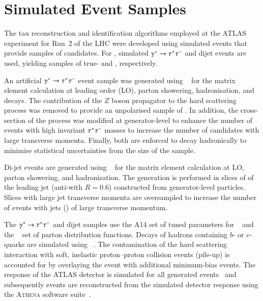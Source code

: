 \section{Simulated Event Samples}%
\label{sec:tauid_mc}

The tau reconstruction and identification algorithms employed at the
ATLAS experiment for Run~2 of the LHC were developed using simulated
events that provide samples of \tauhadvis candidates. For \tauid,
simulated $\gamma^{*} \to \tau^{+} \tau^{-}$ and dijet events are used,
yielding samples of true- and \faketauhadvis, respectively.

An artificial $\gamma^{*} \to \tau^{+} \tau^{-}$ event sample was generated
using \PYTHIA[8.212]~\cite{Sjostrand:2014zea} for the matrix element
calculation at leading order (LO), parton showering, hadronisation,
and \taulepton decays. The contribution of the $Z$ boson propagator to
the hard scattering process was removed to provide an unpolarised
sample of \tauleptons. In addition, the cross-section of the process
was modified at generator-level to enhance the number of events with
high invariant $\tau^{+} \tau^{-}$ masses to increase the number of \tauhadvis
candidates with large transverse momenta. Finally, both \tauleptons
are enforced to decay hadronically to minimise statistical
uncertainties from the size of the \truetauhadvis sample.

Di-jet events are generated using
\PYTHIA[8.186]~\cite{Sjostrand:2014zea} for the matrix element
calculation at LO, parton showering, and hadronisation. The generation
is performed in slices of \pT of the leading jet (anti-\kt with
$R = 0.6$) constructed from generator-level particles. Slices with
large jet transverse momenta are oversampled to increase the number of
events with jets (\faketauhadvis) of large transverse momentum.

The $\gamma^{*} \to \tau^{+} \tau^{-}$ and dijet samples use the A14 set of
tuned parameters for \PYTHIA[8]~\cite{ATL-PHYS-PUB-2014-021} and the
\NNPDF[2.3lo]~\cite{Ball:2012cx} set of parton distribution functions.
Decays of hadrons containing $b$- or $c$-quarks are simulated using
\EVTGEN[v1.2.0]~\cite{Lange:2001uf}. The contamination of the hard
scattering interaction with soft, inelastic proton--proton collision
events (pile-up) is accounted for by overlaying the event with
additional minimum-bias events. The response of the ATLAS detector is
simulated for all generated events~\cite{SOFT-2010-01} and
subsequently events are reconstructed from the simulated detector
response using the \textsc{Athena} software
suite~\cite{ATL-SOFT-PUB-2021-001}.


